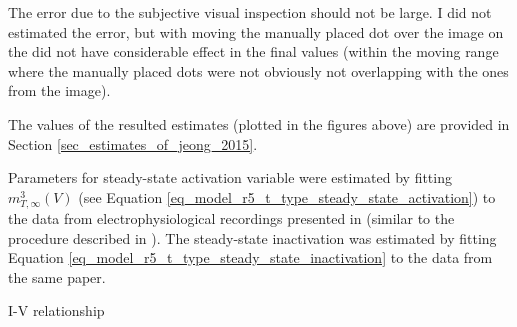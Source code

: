 \documentclass[../main.tex]{subfiles}
\begin{document}
\begin{note}
    The error due to the subjective visual inspection should not be large. I did not estimated the
    error, but with moving the manually placed dot over the image on the did not have considerable
    effect in the final values (within the moving range where the manually placed dots were not
    obviously not overlapping with the ones from the image).

    The values of the resulted estimates (plotted in the figures above) are provided in
    Section \ref{sec_estimates_of_jeong_2015}.
\end{note}


Parameters for steady-state activation variable were estimated by fitting
$m_{T,\infty}^3(V)$ (see Equation \ref{eq_model_r5_t_type_steady_state_activation}) to the data
from electrophysiological recordings presented in \parencite{jeongCaa1TFlyTtype2015} (similar to
the procedure described in \parencite{coulterCalciumCurrentsRat1989}). The steady-state inactivation
was estimated by fitting Equation \ref{eq_model_r5_t_type_steady_state_inactivation} to the
data from the same paper.

I-V relationship
\end{document}
